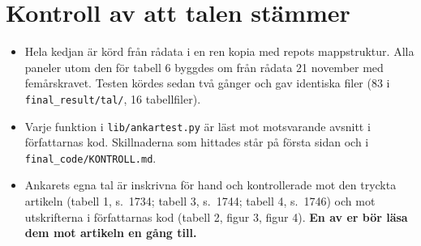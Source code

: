 \documentclass[10pt,a4paper]{article}
\newcommand{\kod}[1]{\texttt{#1}}
\begin{document}
\section{Kontroll av att talen stämmer}
\begin{itemize}[leftmargin=*,itemsep=1pt]
\item Hela kedjan är körd från rådata i en ren kopia med repots mappstruktur. Alla paneler utom den för tabell 6 byggdes om från rådata 21 november med femårskravet. Testen kördes sedan två gånger och gav identiska filer (83 i \kod{final\_result/tal/}, 16 tabellfiler).
\item Varje funktion i \kod{lib/ankartest.py} är läst mot motsvarande avsnitt i författarnas kod. Skillnaderna som hittades står på första sidan och i \kod{final\_code/KONTROLL.md}.
\item Ankarets egna tal är inskrivna för hand och kontrollerade mot den tryckta artikeln (tabell 1, s.~1734; tabell 3, s.~1744; tabell 4, s.~1746) och mot utskrifterna i författarnas kod (tabell 2, figur 3, figur 4). \textbf{En av er bör läsa dem mot artikeln en gång till.}
\end{itemize}
\end{document}
